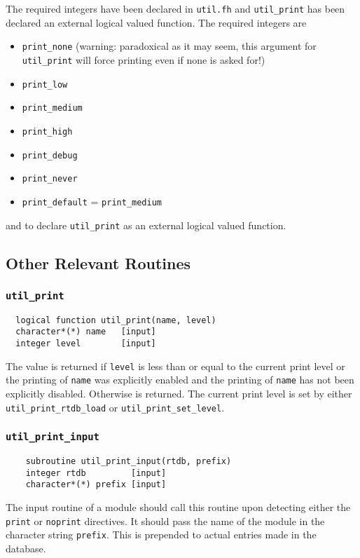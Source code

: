 The required integers have been declared in {\tt util.fh} and 
\verb+util_print+ has been declared an external logical valued function.
The required integers are
\begin{itemize}
\item \verb+print_none+ (warning: paradoxical as it may seem, this argument for
  \verb+util_print+ will force printing even if none is asked for!)
\item \verb+print_low+
\item \verb+print_medium+
\item \verb+print_high+
\item \verb+print_debug+
\item \verb+print_never+
\item \verb+print_default+ = \verb+print_medium+
\end{itemize}
and to declare \verb+util_print+ as an external logical valued function.

\subsection{Other Relevant Routines}

\subsubsection{{\tt util\_print}}
\sloppy
\begin{verbatim}
  logical function util_print(name, level)
  character*(*) name   [input]
  integer level        [input]
\end{verbatim}
The value \TRUE is returned if \verb+level+ is less than or equal to the current print level
or the printing of \verb+name+ was
explicitly enabled and the printing of \verb+name+ has not been
explicitly disabled.  Otherwise
\FALSE is returned.
The current print level is set by either \verb+util_print_rtdb_load+ or
\verb+util_print_set_level+.

\fussy

\subsubsection{{\tt util\_print\_input}}
\begin{verbatim}
    subroutine util_print_input(rtdb, prefix)
    integer rtdb         [input]
    character*(*) prefix [input]
\end{verbatim}
The input routine of a module should call this routine upon detecting
either the {\tt print} or {\tt noprint} directives.  It should pass
the name of the module in the character string {\tt prefix}.  This is
prepended to actual entries made in the database.

